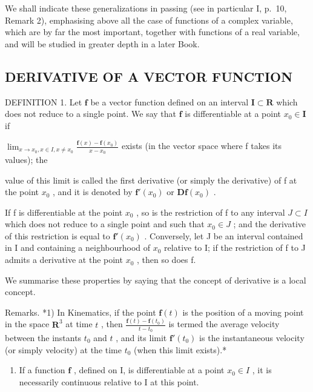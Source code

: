 We shall indicate these generalizations in passing (see in particular I, p.~10, Remark 2), emphasising above all the case of functions of a complex variable, which are by far the most important, together with functions of a real variable, and will be studied in greater depth in a later Book.

\subsection{DERIVATIVE OF A VECTOR FUNCTION}

DEFINITION 1. Let \(\mathbf{f}\) be a vector function defined on an interval \(\mathbf{I} \subset \mathbf{R}\) which does not reduce to a single point. We say that \(\mathbf{f}\) is differentiable at a point \(x_0 \in \mathbf{I}\) if

\(\lim_{x\to x_{0},x\in I,x\neq x_{0}}\frac{\mathbf{f}(x)-\mathbf{f}(x_{0})}{x-x_{0}}\) exists (in the vector space where f takes its values); the

value of this limit is called the first derivative (or simply the derivative) of f at the point \(x_{0}\) , and it is denoted by \(\mathbf{f}'(x_{0})\) or \(\mathbf{D}\mathbf{f}(x_{0})\) .

If f is differentiable at the point \(x_{0}\) , so is the restriction of f to any interval \(J \subset I\) which does not reduce to a single point and such that \(x_{0} \in J\) ; and the derivative of this restriction is equal to \(\mathbf{f}'(x_{0})\) . Conversely, let J be an interval contained in I and containing a neighbourhood of \(x_{0}\) relative to I; if the restriction of f to J admits a derivative at the point \(x_{0}\) , then so does f.

We summarise these properties by saying that the concept of derivative is a local concept.

Remarks. *1) In Kinematics, if the point \(\mathbf{f}(t)\) is the position of a moving point in the space \(\mathbf{R}^3\) at time \(t\) , then \(\frac{\mathbf{f}(t) - \mathbf{f}(t_0)}{t - t_0}\) is termed the average velocity between the instants \(t_0\) and \(t\) , and its limit \(\mathbf{f}'(t_0)\) is the instantaneous velocity (or simply velocity) at the time \(t_0\) (when this limit exists).*

\begin{enumerate}
\def\labelenumi{\arabic{enumi})}
\setcounter{enumi}{1}
\tightlist
\item
  If a function \(\mathbf{f}\) , defined on I, is differentiable at a point \(x_0 \in I\) , it is necessarily continuous relative to I at this point.
\end{enumerate}

